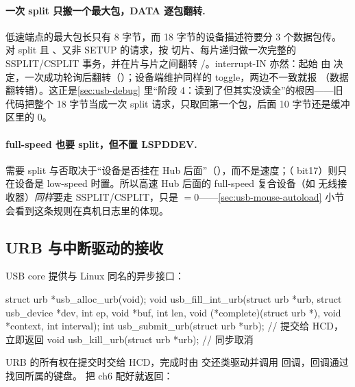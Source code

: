 \paragraph{一次 split 只搬一个最大包，DATA 逐包翻转.}
低速端点的最大包长只有 8 字节，而 18 字节的设备描述符要分 3 个数据包传。 对 split 且 、又非 SETUP 的请求，按  切片、每片递归做一次完整的 SSPLIT/CSPLIT 事务，并在片与片之间翻转 /。interrupt-IN 亦然：起始  由  决定，一次成功轮询后翻转（）；设备端维护同样的 toggle，两边不一致就报 （数据翻转错）。这正是\ref{sec:usb-debug} 里“阶段 4：读到了但其实没读全”的根因——旧代码把整个 18 字节当成一次 split 请求，只取回第一个包，后面 10 字节还是缓冲区里的 0。

\paragraph{full-speed 也要 split，但不置 LSPDDEV.}
需要 split 与否取决于“设备是否挂在 Hub 后面”（），而不是速度；（ bit17）则只在设备是 low-speed 时置。所以高速 Hub 后面的 full-speed 复合设备（如  无线接收器）\emph{同样}要走 SSPLIT/CSPLIT，只是 $=0$——\ref{sec:usb-mouse-autoload} 小节会看到这条规则在真机日志里的体现。

\subsection{URB 与中断驱动的接收}

USB core 提供与 Linux 同名的异步接口：

\begin{ccode}
struct urb *usb_alloc_urb(void);
void usb_fill_int_urb(struct urb *urb, struct usb_device *dev, int ep, void *buf,
                      int len, void (*complete)(struct urb *), void *context, int interval);
int  usb_submit_urb(struct urb *urb);       // 提交给 HCD，立即返回
void usb_kill_urb(struct urb *urb);         // 同步取消
\end{ccode}

URB 的所有权在提交时交给 HCD，完成时由  交还类驱动并调用  回调，回调通过  找回所属的键盘。 把 ch6 配好就返回：

